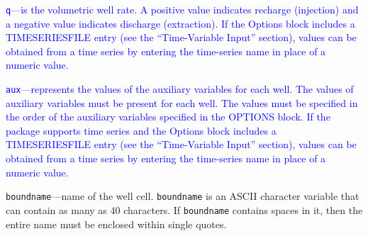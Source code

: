\item \textcolor{blue}{\texttt{q}---is the volumetric well rate. A positive value indicates recharge (injection) and a negative value indicates discharge (extraction). If the Options block includes a TIMESERIESFILE entry (see the ``Time-Variable Input'' section), values can be obtained from a time series by entering the time-series name in place of a numeric value.}

\item \textcolor{blue}{\texttt{aux}---represents the values of the auxiliary variables for each well. The values of auxiliary variables must be present for each well. The values must be specified in the order of the auxiliary variables specified in the OPTIONS block.  If the package supports time series and the Options block includes a TIMESERIESFILE entry (see the ``Time-Variable Input'' section), values can be obtained from a time series by entering the time-series name in place of a numeric value.}

\item \texttt{boundname}---name of the well cell.  \texttt{boundname} is an ASCII character variable that can contain as many as 40 characters.  If \texttt{boundname} contains spaces in it, then the entire name must be enclosed within single quotes.


